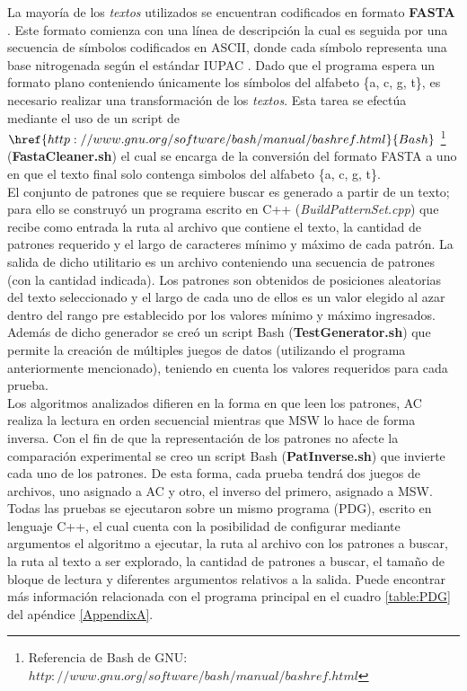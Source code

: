La mayoría de los \emph{textos} utilizados se encuentran codificados en formato {\bf FASTA} \cite{website:fasta}. Este formato comienza con una línea de descripción la cual es seguida por una secuencia de símbolos codificados en ASCII, donde cada símbolo representa una base nitrogenada según el estándar IUPAC \cite{website:iupac}. Dado que el programa espera un formato plano conteniendo únicamente los símbolos del alfabeto \{a, c, g, t\}, es necesario realizar una transformación de los \emph{textos}. Esta tarea se efectúa mediante el uso de un script de $\href{http://www.gnu.org/software/bash/manual/bashref.html}{Bash}$ \footnote{Referencia de Bash de GNU: $http://www.gnu.org/software/bash/manual/bashref.html$} ({\bf FastaCleaner.sh}) el cual se encarga de la conversión del formato FASTA a uno en que el texto final solo contenga simbolos del alfabeto \{a, c, g, t\}.\\
El conjunto de patrones que se requiere buscar es generado a partir de un texto; para ello se construyó un programa escrito en C++ ({\it BuildPatternSet.cpp}) que recibe como entrada la ruta al archivo que contiene el texto, la cantidad de patrones requerido y el largo de caracteres mínimo y máximo de cada patrón. La salida de dicho utilitario es un archivo conteniendo una secuencia de patrones (con la cantidad indicada). Los patrones son obtenidos de posiciones aleatorias del texto seleccionado y el largo de cada uno de ellos es un valor elegido al azar dentro del rango pre establecido por los valores mínimo y máximo ingresados.\\
Además de dicho generador se creó un script Bash ({\bf TestGenerator.sh}) que permite la creación de múltiples juegos de datos (utilizando el programa anteriormente mencionado), teniendo en cuenta los valores requeridos para cada prueba.\\
Los algoritmos analizados difieren en la forma en que leen los patrones, AC realiza la lectura en orden secuencial mientras que MSW lo hace de forma inversa. Con el fin de que la representación de los patrones no afecte la comparación experimental se creo un script Bash ({\bf PatInverse.sh}) que invierte cada uno de los patrones. De esta forma, cada prueba tendrá dos juegos de archivos, uno asignado a AC y otro, el inverso del primero, asignado a MSW.\\
Todas las pruebas se ejecutaron sobre un mismo programa (PDG), escrito en lenguaje C++, el cual cuenta con la posibilidad de configurar mediante argumentos el algoritmo a ejecutar, la ruta al archivo con los patrones a buscar, la ruta al texto a ser explorado, la cantidad de patrones a buscar, el tamaño de bloque de lectura y diferentes argumentos relativos a la salida. Puede encontrar más información relacionada con el programa principal en el cuadro \ref{table:PDG} del apéndice \ref{AppendixA}.\\
